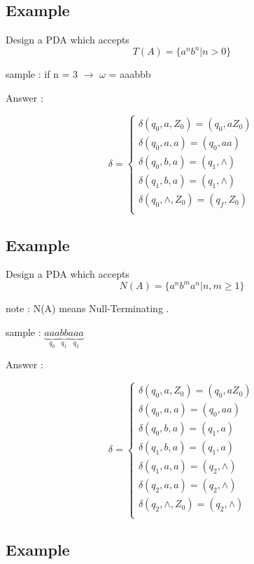 \documentclass[12pt]{book}
\begin{document}
\subsection{Example}

Design a PDA which accepts 
$$
T(A) = \{ a^{n} b^{n} | n > 0 \}
$$

sample : if n = 3 $\to$ $\omega$ = aaabbb


Answer :

$$
\delta = 
\begin{cases}
\delta(q_{0},a,Z_{0}) = (q_{0}, aZ_{0}) \\
\delta(q_{0},a,a) = (q_{0},aa) \\
\delta(q_{0},b,a) = (q_{1},\wedge) \\
\delta(q_{1},b,a) = (q_{1},\wedge) \\
\delta(q_{0},\wedge,Z_{0}) = (q_{f},Z_{0}) \\
\end{cases}
$$




\subsection{Example}

Design a PDA which accepts 
$$
N(A) = \{ a^{n} b^{m}a^{n} | n, m \geq 1 \}
$$

note : N(A) means Null-Terminating .

sample : $\underbrace{aaa}_{q_{0}}\underbrace{bb}_{q_{1}}\underbrace{aaa}_{q_{2}}$


Answer :

$$
\delta = 
\begin{cases}
\delta(q_{0},a,Z_{0}) = (q_{0}, aZ_{0}) \\
\delta(q_{0},a,a) = (q_{0},aa) \\
\delta(q_{0},b,a) = (q_{1},a) \\
\delta(q_{1},b,a) = (q_{1},a) \\
\delta(q_{1},a,a) = (q_{2},\wedge) \\
\delta(q_{2},a,a) = (q_{2},\wedge) \\
\delta(q_{2},\wedge,Z_{0}) = (q_{2},\wedge) \\
\end{cases}
$$



\subsection{Example}
\end{document}
